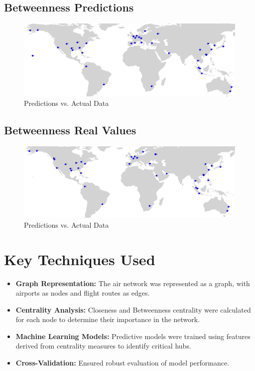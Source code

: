 \documentclass[12pt]{article}
\begin{document}
\newpage
\subsection*{Betweenness Predictions}
\begin{figure}[h!]
	\centering
	\includegraphics[width=1\textwidth]{figures/b_pred.png}
	\caption{Predictions vs. Actual Data}
	\label{fig:betweennesspredictions}
\end{figure}

\subsection*{Betweenness Real Values}
\begin{figure}[h!]
	\centering
	\includegraphics[width=1\textwidth]{figures/b.png}
	\caption{Predictions vs. Actual Data}
	\label{fig:betweenness}
\end{figure}

\newpage

\section*{Key Techniques Used}
\begin{itemize}
	\item \textbf{Graph Representation:} The air network was represented as a graph, with airports as nodes and flight routes as edges.
	\item \textbf{Centrality Analysis:} Closeness and Betweenness centrality were calculated for each node to determine their importance in the network.
	\item \textbf{Machine Learning Models:} Predictive models were trained using features derived from centrality measures to identify critical hubs.
	\item \textbf{Cross-Validation:} Ensured robust evaluation of model performance.
\end{itemize}
\end{document}
